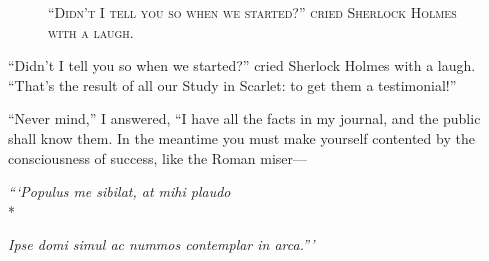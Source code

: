\documentclass[12pt,english,oneside]{book}
\newcommand{\noun}[1]{\textsc{#1}}
\newcommand{\mdsh}[1]{\mbox{#1}\linebreak[1]}
\begin{document}
%
\begin{figure}[htbp]
\noindent {}

\noindent \begin{center}\noun{{}``Didn't I tell you so when we
started?'' cried Sherlock Holmes with a laugh.}\end{center}
\end{figure}
{}``Didn't I tell you so when we started?'' cried Sherlock Holmes
with a laugh. {}``That's the result of all our Study in Scarlet:
to get them a testimonial!''

{}``Never mind,'' I answered, {}``I have all the facts in my journal,
and the public shall know them. In the meantime you must make yourself
contented by the consciousness of success, like the Roman miser\mdsh{---}

\begin{center} \footnotesize

\textit{```Populus me sibilat, at mihi plaudo} \\*

\textit{Ipse domi simul ac nummos contemplar in arca.'''}

\end{center}
\end{document}
